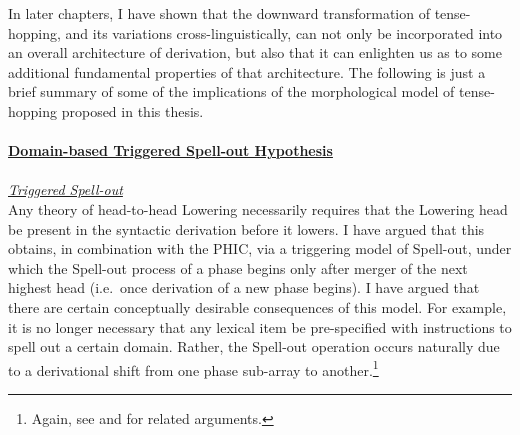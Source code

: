 In later chapters, I have shown that the downward transformation of tense-hopping, and its variations cross-linguistically, can not only be incorporated into an overall architecture of derivation, but also that it can enlighten us as to some additional fundamental properties of that architecture. The following is just a brief summary of some of the implications of the morphological model of tense-hopping proposed in this thesis.\\\\
\underline{\textbf{Domain-based Triggered Spell-out Hypothesis}}\\\\
\underline{\textit{Triggered Spell-out}}\\
Any theory of head-to-head Lowering necessarily requires that the Lowering head be present in the syntactic derivation before it lowers. I have argued that this obtains, in combination with the PHIC, via a triggering model of Spell-out, under which the Spell-out process of a phase begins only after merger of the next highest head (i.e.\ once derivation of a new phase begins). I have argued that there are certain conceptually desirable consequences of this model. For example, it is no longer necessary that any lexical item be pre-specified with instructions to spell out a certain domain. Rather, the Spell-out operation occurs naturally due to a derivational shift from one phase sub-array to another.\footnote{Again, see \citet{svenonius2004} and \citet{grohmann2003} for related arguments.}

